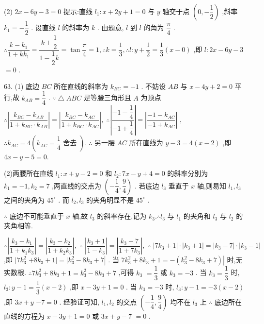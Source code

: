 (2) ${2x} - {6y} - 3 = 0$ 提示:直线 ${l}_{1} : x + {2y} + 1 = 0$ 与 $y$ 轴交于点 $\left( {0, - \dfrac{1}{2}}\right)$ ,斜率 ${k}_{1} =  - \dfrac{1}{2}$ . 设直线 $l$ 的斜率为 $k$ . 由题意, $l$ 到 $l$ 的角为 $\dfrac{\pi }{4}$ . $\therefore \dfrac{k - {k}_{1}}{1 + k{k}_{1}} = \dfrac{k + \dfrac{1}{2}}{1 - \dfrac{1}{2}k} = \tan \dfrac{\pi }{4} = 1,\therefore k = \dfrac{1}{3},\therefore l : y + \dfrac{1}{2} = \dfrac{1}{3}\left( {x - 0}\right)$ ,即 $l : {2x} - {6y} - 3$  $= 0$ .

63. (1) 底边 ${BC}$ 所在直线的斜率为 ${k}_{BC} =  - 1$ . 不妨设 ${AB}$ 与 $x - {4y} + 2 = 0$ 平行,故 ${k}_{AB} = \dfrac{1}{4}$ . $\because \bigtriangleup {ABC}$ 是等腰三角形且 $A$ 为顶点 $\therefore \left| \dfrac{{k}_{BC} - {k}_{AB}}{1 + {k}_{BC} \cdot  {k}_{AB}}\right|  = \left| \dfrac{{k}_{BC} - {k}_{AC}}{1 + {k}_{BC} \cdot  {k}_{AC}}\right| ,\;\therefore \left| \dfrac{-1 - \dfrac{1}{4}}{-1 + \dfrac{1}{4}}\right|  = \left| \dfrac{-1 - {k}_{AC}}{-1 + {k}_{AC}}\right|$ , $\therefore {k}_{AC} = 4\left( {{k}_{AC} = \dfrac{1}{4}\text{ 舍去 }}\right) .\;\therefore$ 另一腰 ${AC}$ 所在直线为 $y - 3 = 4\left( {x - 2}\right)$ ,即 ${4x} - y - 5 = 0.$

(2)两腰所在直线 ${l}_{1} : x + y - 2 = 0$ 和 ${l}_{2} : {7x} - y + 4 = 0$ 的斜率分别为 ${k}_{1} =  - 1,{k}_{2} = 7$ ,两直线的交点为 $\left( {-\dfrac{1}{4},\dfrac{9}{4}}\right)$ . 若底边 ${l}_{3}$ 垂直于 $x$ 轴,则易知 ${l}_{1},{l}_{3}$ 之间的夹角为 ${45}^{ \circ  }$ . 而 ${l}_{2},{l}_{3}$ 的夹角明显不是 ${45}^{ \circ  }$ .

$\therefore$ 底边不可能垂直于 $x$ 轴,故 ${l}_{3}$ 的斜率存在,记为 ${k}_{3}.\therefore {l}_{3}$ 与 ${l}_{1}$ 的夹角和 ${l}_{3}$ 与 ${l}_{2}$ 的夹角相等.

$\therefore \left| \dfrac{{k}_{3} - {k}_{1}}{1 + {k}_{1}{k}_{3}}\right|  = \left| \dfrac{{k}_{3} - {k}_{2}}{1 + {k}_{2}{k}_{3}}\right| ,\;\therefore \;\left| \dfrac{{k}_{3} + 1}{1 - {k}_{3}}\right|  = \left| \dfrac{{k}_{3} - 7}{1 + 7{k}_{3}}\right| ,\;\therefore \;\left| {7{k}_{3} + 1}\right|  \cdot  \left| {{k}_{3} + 1}\right|  = \left| {{k}_{3} - 7}\right|  \cdot  \left| {{k}_{3} - 1}\right|$ ,即 $\mid  7{k}_{3}^{2}$  $+ 8{k}_{3} + 1\left|  = \right| {k}_{3}^{2} - 8{k}_{3} + 7\left| {\text{ . 当 }7{k}_{3}^{2} + 8{k}_{3} + 1 =  - \left( {{k}_{3}^{2} - 8{k}_{3} + 7}\right) }\right|$ 时,无实数根. $\therefore 7{k}_{3}^{2} + 8{k}_{3} + 1 = {k}_{3}^{2} - 8{k}_{3} + 7$ ,可得 ${k}_{3}$  $= \dfrac{1}{3}$ 或 ${k}_{3} =  - 3$ . 当 ${k}_{3} = \dfrac{1}{3}$ 时, ${l}_{3} : y - 1 = \dfrac{1}{3}\left( {x - 2}\right)$ ,即 $x - {3y} + 1 = 0$ . 当 ${k}_{3} =  - 3$ 时, ${l}_{3} : y - 1 =  - 3\left( {x - 2}\right)$ ,即 ${3x} + y$  $- 7 = 0$ . 经验证可知, ${l}_{1},{l}_{2}$ 的交点 $\left( {-\dfrac{1}{4},\dfrac{9}{4}}\right)$ 均不在 ${l}_{3}$ 上 $\therefore$ 底边所在直线的方程为 $x - {3y} + 1 = 0$ 或 ${3x} + y - 7$  $= 0$ .

